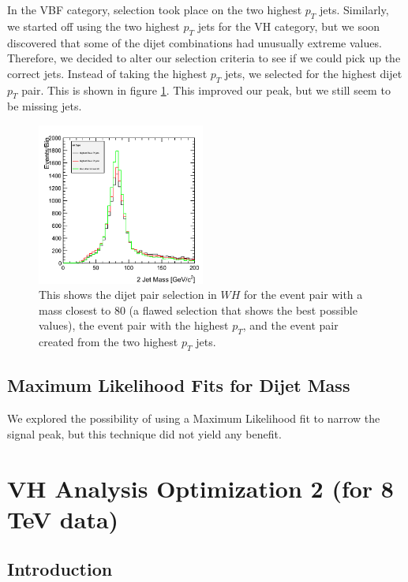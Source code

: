 \documentclass[12pt]{article}
\begin{document}
In the VBF category, selection took place on the two highest $p_{T}$ jets. 
Similarly, we started off using the two highest $p_{T}$ jets for the VH category, 
but we soon discovered that some of the dijet combinations had unusually extreme values. 
Therefore, we decided to alter our selection criteria to see if we could pick up the correct jets. 
Instead of taking the highest $p_{T}$ jets, we selected for the highest dijet $p_{T}$ pair. This is shown 
in figure \ref{fig:dijetSel}. This improved our peak, but we still seem to be missing jets.
\begin{figure}[!hbtp]
\begin{center}
    \includegraphics[width=0.49\textwidth]{images/Hist_Reco2PlotsPt30Eta2.png}
    \caption{ \label{fig:dijetSel}
         This shows the dijet pair selection in $WH$ for the event pair with a mass closest to 80 (a flawed selection that 
	 shows the best possible values), the event pair with the highest $p_{T}$, and the event pair created from the two highest $p_{T}$ jets.
      }
\end{center}
\end{figure}

\subsection{Maximum Likelihood Fits for Dijet Mass}

We explored the possibility of using a Maximum Likelihood fit to narrow the signal peak, but this technique did not yield any benefit.

\section{VH Analysis Optimization 2 (for 8 TeV data)}

\subsection{Introduction}
\end{document}
